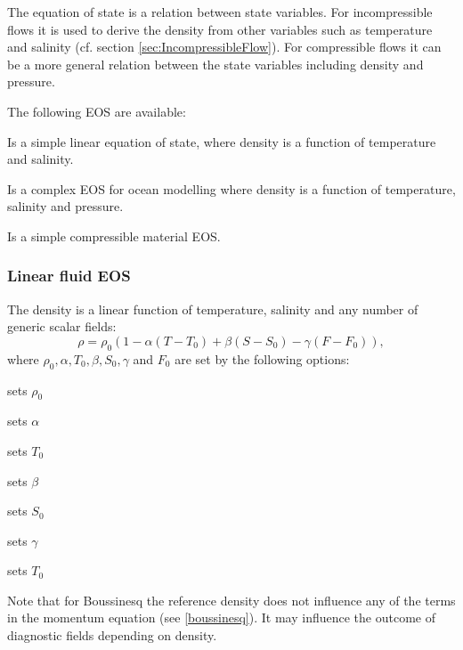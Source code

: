 The equation of state is a relation between state
variables. For incompressible flows it is used to derive the density
from other variables such as temperature and salinity (cf. section \ref{sec:IncompressibleFlow}). For compressible
flows it can be a more general relation between the state variables
including density and pressure.

The following EOS are available:

\begin{description}
\item{}
Is a simple linear equation of state,
where density is a function of temperature and salinity.

\item{} Is a complex EOS for ocean modelling where density is a function of temperature, salinity and pressure.
\item{} Is a simple compressible material EOS.
\end{description}

\subsubsection{Linear fluid EOS}
The density is a linear function of temperature, salinity and any number of generic scalar fields:
\begin{equation}
  \rho=\rho_0 \left(1-\alpha(T-T_0)+\beta (S-S_0) - \gamma (F - F_0) \right),
\end{equation}
where $\rho_0, \alpha, T_0, \beta, S_0, \gamma$ and $F_0$ are set by the following
options:
\begin{description}
\item {} sets $\rho_0$
\item {} sets $\alpha$
\item {} sets $T_0$
\item {} sets $\beta$
\item {} sets $S_0$
\item {} sets $\gamma$
\item {} sets $T_0$
\end{description}
Note that for Boussinesq the reference density does not
influence any of the terms in the
momentum equation (see \eqref{boussinesq}). It may influence the outcome
of diagnostic fields depending on density.

